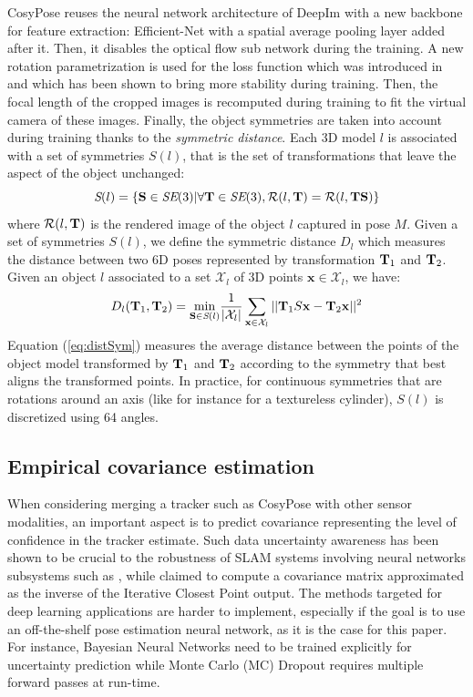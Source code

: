 CosyPose reuses the neural network architecture of DeepIm with a new backbone for feature extraction: Efficient-Net \cite{tan2020efficientnet} with a spatial average pooling layer added after it. Then, it disables the optical flow sub network during the training. A new rotation parametrization is used for the loss function which was introduced in \cite{zhou2020continuity} and which has been shown to bring more stability during training. Then, the focal length of the cropped images is recomputed during training to fit the virtual camera of these images. Finally, the object symmetries are taken into account during training thanks to the \textit{symmetric distance}. Each 3D model $l$ is associated with a set of symmetries $S(l)$, that is the set of transformations that leave the aspect of the object unchanged:
\begin{equation}
    \textit{S}(l) = \left \{ {\bf S} \in \textit{SE}(3) | \forall {\bf T} \in \textit{SE}(3), \mathcal{R}(l,{\bf T}) = \mathcal{R}(l,{\bf T} {\bf S})\right \}
\end{equation}
where $\mathcal{R}(l,{\bf T})$ is the rendered image of the object $l$ captured in pose $M$. Given a set of symmetries $S(l)$, we define the symmetric distance $D_l$ which measures the distance between two 6D poses represented by transformation ${\bf T}_1$ and ${\bf T}_2$. Given an object $l$ associated to a set $\mathcal{X}_l$ of 3D points $\mathbf{x} \in \mathcal{X}_l$, we have:
\begin{equation}
    D_l({\bf T}_1, {\bf T}_2) = \underset{{\bf S} \in \textit{S}(l)}{\text{min}} \frac{1}{|\mathcal{X}_l|} \sum_{\mathbf{x} \in \mathcal{X}_l} ||{\bf T}_1 S\mathbf{x} - {\bf T}_2\mathbf{x} ||^2
    \label{eq:distSym}
\end{equation}
Equation (\ref{eq:distSym}) measures the average distance between the points of the object model transformed by ${\bf T}_1$ and ${\bf T}_2$ according to the symmetry that best aligns the transformed points. In practice, for continuous symmetries  that are rotations around an axis (like for instance for a textureless cylinder), $S(l)$ is discretized using 64 angles.


\subsection{Empirical covariance estimation}

When considering merging a tracker such as CosyPose with other sensor modalities, an important aspect is to predict covariance representing the level 
of confidence in the tracker estimate. Such data uncertainty awareness has been shown to be crucial to the robustness of SLAM systems involving neural networks 
subsystems such as \cite{yang2020d3vo}, while \cite{SalasMoreno2013SLAMSL} claimed to compute a covariance matrix approximated as the inverse of the 
Iterative Closest Point output. The methods targeted for deep learning applications are harder to implement, especially if the goal 
is to use an off-the-shelf pose estimation neural network, as it is the case for this paper. For instance, Bayesian Neural Networks \cite{jospin2020hands} 
need to be trained explicitly for uncertainty prediction while Monte Carlo (MC) Dropout \cite{gal2016dropout} requires multiple forward passes at run-time.

